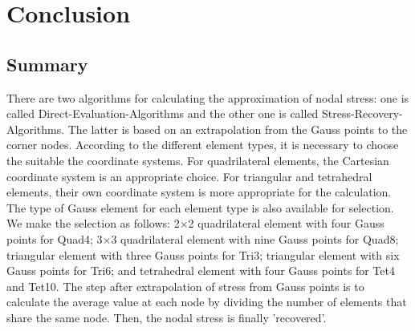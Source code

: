 \chapter{Conclusion}
\section{Summary}
There are two algorithms for calculating the approximation of nodal stress: one is called Direct-Evaluation-Algorithms and the other one is called Stress-Recovery-Algorithms. The latter is based on an extrapolation from the Gauss points to the corner nodes. According to the different element types, it is necessary to choose the suitable the coordinate systems. For quadrilateral elements, the Cartesian coordinate system is an appropriate choice. For triangular and tetrahedral elements, their own coordinate system is more appropriate for the calculation. The type of Gauss element for each element type is also available for selection. We make the selection as follows: 2$\times$2 quadrilateral element with four Gauss points for Quad4; 3$\times$3 quadrilateral element with nine Gauss points for Quad8; triangular element with three Gauss points for Tri3; triangular element with six Gauss points for Tri6; and tetrahedral element with four Gauss points for Tet4 and Tet10. The step after extrapolation of stress from Gauss points is to calculate the average value at each node by dividing the number of elements that share the same node. Then, the nodal stress is finally 'recovered'. 

